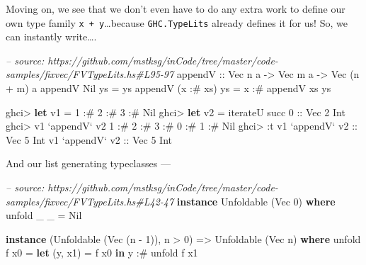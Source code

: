 \documentclass[]{article}
\newenvironment{Shaded}{}{}
\newcommand{\KeywordTok}[1]{\textcolor[rgb]{0.00,0.44,0.13}{\textbf{{#1}}}}
\newcommand{\DataTypeTok}[1]{\textcolor[rgb]{0.56,0.13,0.00}{{#1}}}
\newcommand{\DecValTok}[1]{\textcolor[rgb]{0.25,0.63,0.44}{{#1}}}
\newcommand{\CommentTok}[1]{\textcolor[rgb]{0.38,0.63,0.69}{\textit{{#1}}}}
\newcommand{\OtherTok}[1]{\textcolor[rgb]{0.00,0.44,0.13}{{#1}}}
\newcommand{\FunctionTok}[1]{\textcolor[rgb]{0.02,0.16,0.49}{{#1}}}
\newcommand{\NormalTok}[1]{{#1}}
\begin{document}
Moving on, we see that we don't even have to do any extra work to define
our own type family \texttt{x\ +\ y}\ldots{}because
\texttt{GHC.TypeLits} already defines it for us! So, we can instantly
write\ldots{}.

\begin{Shaded}
\begin{Highlighting}[]
\CommentTok{-- source: https://github.com/mstksg/inCode/tree/master/code-samples/fixvec/FVTypeLits.hs#L95-97}
\OtherTok{appendV ::} \DataTypeTok{Vec} \NormalTok{n a }\OtherTok{->} \DataTypeTok{Vec} \NormalTok{m a }\OtherTok{->} \DataTypeTok{Vec} \NormalTok{(n }\FunctionTok{+} \NormalTok{m) a}
\NormalTok{appendV }\DataTypeTok{Nil}       \NormalTok{ys }\FunctionTok{=} \NormalTok{ys}
\NormalTok{appendV (x }\FunctionTok{:#} \NormalTok{xs) ys }\FunctionTok{=} \NormalTok{x }\FunctionTok{:#} \NormalTok{appendV xs ys}
\end{Highlighting}
\end{Shaded}

\begin{Shaded}
\begin{Highlighting}[]
\NormalTok{ghci}\FunctionTok{>} \KeywordTok{let} \NormalTok{v1 }\FunctionTok{=} \DecValTok{1} \FunctionTok{:#} \DecValTok{2} \FunctionTok{:#} \DecValTok{3} \FunctionTok{:#} \DataTypeTok{Nil}
\NormalTok{ghci}\FunctionTok{>} \KeywordTok{let} \NormalTok{v2 }\FunctionTok{=} \NormalTok{iterateU succ }\DecValTok{0}\OtherTok{ ::} \DataTypeTok{Vec} \DecValTok{2} \DataTypeTok{Int}
\NormalTok{ghci}\FunctionTok{>} \NormalTok{v1 }\OtherTok{`appendV`} \NormalTok{v2}
\DecValTok{1} \FunctionTok{:#} \DecValTok{2} \FunctionTok{:#} \DecValTok{3} \FunctionTok{:#} \DecValTok{0} \FunctionTok{:#} \DecValTok{1} \FunctionTok{:#} \DataTypeTok{Nil}
\NormalTok{ghci}\FunctionTok{>} \FunctionTok{:}\NormalTok{t v1 }\OtherTok{`appendV` v2 ::} \DataTypeTok{Vec} \DecValTok{5} \DataTypeTok{Int}
\NormalTok{v1 }\OtherTok{`appendV` v2 ::} \DataTypeTok{Vec} \DecValTok{5} \DataTypeTok{Int}
\end{Highlighting}
\end{Shaded}

And our list generating typeclasses ---

\begin{Shaded}
\begin{Highlighting}[]
\CommentTok{-- source: https://github.com/mstksg/inCode/tree/master/code-samples/fixvec/FVTypeLits.hs#L42-47}
\KeywordTok{instance} \DataTypeTok{Unfoldable} \NormalTok{(}\DataTypeTok{Vec} \DecValTok{0}\NormalTok{) }\KeywordTok{where}
    \NormalTok{unfold _ _ }\FunctionTok{=} \DataTypeTok{Nil}

\KeywordTok{instance} \NormalTok{(}\DataTypeTok{Unfoldable} \NormalTok{(}\DataTypeTok{Vec} \NormalTok{(n }\FunctionTok{-} \DecValTok{1}\NormalTok{)), n }\FunctionTok{>} \DecValTok{0}\NormalTok{) }\OtherTok{=>} \DataTypeTok{Unfoldable} \NormalTok{(}\DataTypeTok{Vec} \NormalTok{n) }\KeywordTok{where}
    \NormalTok{unfold f x0 }\FunctionTok{=} \KeywordTok{let} \NormalTok{(y, x1) }\FunctionTok{=} \NormalTok{f x0}
                  \KeywordTok{in}  \NormalTok{y }\FunctionTok{:#} \NormalTok{unfold f x1}
\end{Highlighting}
\end{Shaded}
\end{document}
